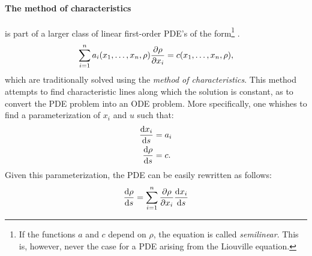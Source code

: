 \paragraph{The method of characteristics}
 is part of a larger class of linear first-order PDE's of the form\footnote{If the functions $a$ and $c$ depend on $\rho$, the equation is called \emph{semilinear}. This is, however, never the case for a PDE arising from the Liouville equation.} \cite[p. 207]{Farlow1989}.
\begin{equation}
    \sum_{i=1}^n a_i(x_1, \ldots, x_n, \rho) \pdv{\rho}{x_i} = c(x_1, \ldots, x_n, \rho),
\end{equation}
which are traditionally solved using the \emph{method of characteristics}. This method attempts to find characteristic lines along which the solution is constant, as to convert the PDE problem into an ODE problem. More specifically, one whishes to find a parameterization of $x_i$ and $u$ such that:
\begin{equation}
    \begin{split}
        \dv{x_i}{s} &= a_i\\
        \dv{\rho}{s} &= c.
    \end{split}
\end{equation}
Given this parameterization, the PDE can be easily rewritten as follows: \cite{Farlow1989}
$$ \dv{\rho}{s} = \sum_{i = 1}^n \pdv{\rho}{x_i}\dv{x_i}{s} $$
